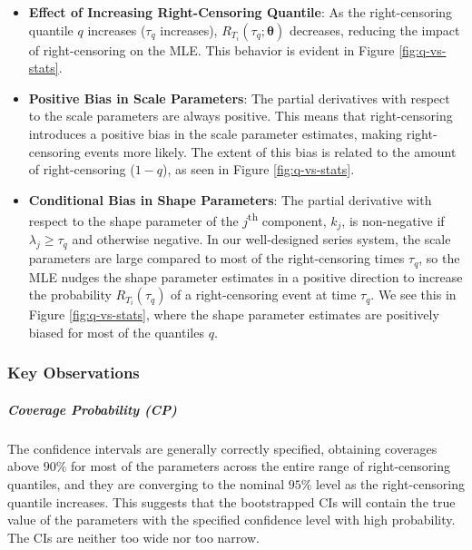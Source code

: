 \documentclass[
]{article}
\theoremstyle{definition}
\theoremstyle{plain}
\theoremstyle{definition}
\theoremstyle{definition}
\theoremstyle{definition}
\theoremstyle{definition}
\theoremstyle{remark}
\begin{document}
\begin{itemize}
\item
  \textbf{Effect of Increasing Right-Censoring Quantile}: As the right-censoring
  quantile \(q\) increases (\(\tau_q\) increases), \(R_{T_i}(\tau_q;\boldsymbol{\theta})\) decreases,
  reducing the impact of right-censoring on the MLE. This behavior is evident in
  Figure \ref{fig:q-vs-stats}.
\item
  \textbf{Positive Bias in Scale Parameters}: The partial derivatives with respect to
  the scale parameters are always positive. This means that right-censoring
  introduces a positive bias in the scale parameter estimates, making
  right-censoring events more likely. The extent of this bias is related
  to the amount of right-censoring (\(1-q\)), as seen in Figure \ref{fig:q-vs-stats}.
\item
  \textbf{Conditional Bias in Shape Parameters}: The partial derivative with respect
  to the shape parameter of the \(j\)\textsuperscript{th} component, \(k_j\), is
  non-negative if \(\lambda_j \geq \tau_q\) and otherwise negative. In our
  well-designed series system, the scale parameters are large compared to most of
  the right-censoring times \(\tau_q\), so the MLE nudges the shape parameter
  estimates in a positive direction to increase the probability \(R_{T_i}(\tau_q)\) of a
  right-censoring event at time \(\tau_q\). We see this in Figure
  \ref{fig:q-vs-stats}, where the shape parameter estimates are positively biased
  for most of the quantiles \(q\).
\end{itemize}

\hypertarget{key-observations}{%
\subsubsection{Key Observations}\label{key-observations}}

\hypertarget{coverage-probability-cp}{%
\subparagraph*{Coverage Probability (CP)}\label{coverage-probability-cp}}

The confidence intervals are generally correctly specified, obtaining coverages
above \(90\%\) for most of the parameters across the entire range of right-censoring
quantiles, and they are converging to the nominal \(95\%\) level as the
right-censoring quantile increases. This suggests that the bootstrapped CIs will
contain the true value of the parameters with the specified confidence level
with high probability. The CIs are neither too wide nor too narrow.
\end{document}
